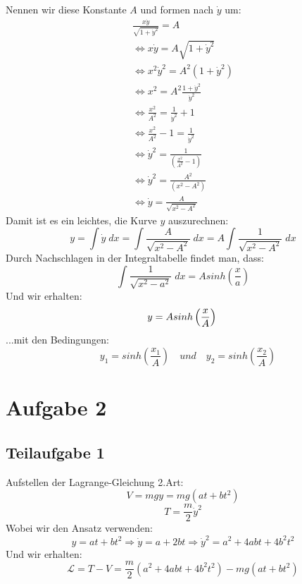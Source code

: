 \documentclass[a4paper,german,12pt,smallheadings]{scrartcl}
\begin{document}
Nennen wir diese Konstante $A$ und formen nach $\dot{y}$ um:
\begin{align*}
\frac{x \dot{y}}{\sqrt{1+ \dot{y}^2}}=A\\
\Leftrightarrow x \dot{y}=A \sqrt{1+\dot{y}^2}\\
\Leftrightarrow x^2 \dot{y}^2=A^2\left(1+\dot{y}^2\right)\\
\Leftrightarrow x^2=A^2 \frac{1+\dot{y}^2}{\dot{y}^2}\\
\Leftrightarrow \frac{x^2}{A^2}=\frac{1}{\dot{y}^2}+1\\
\Leftrightarrow \frac{x^2}{A^2}-1=\frac{1}{\dot{y}^2}\\
\Leftrightarrow \dot{y}^2=\frac{1}{\left(\frac{x^2}{A^2}-1\right)}\\
\Leftrightarrow \dot{y}^2=\frac{A^2}{\left(x^2-A^2\right)}\\
\Leftrightarrow \dot{y}=\frac{A}{\sqrt{x^2-A^2}}
\end{align*}
Damit ist es ein leichtes, die Kurve $y$ auszurechnen:
\begin{equation}
y=\int \dot{y} \; dx=\int \frac{A}{\sqrt{x^2-A^2}} \; dx=A \int \frac{1}{\sqrt{x^2-A^2}} \; dx
\end{equation}
Durch Nachschlagen in der Integraltabelle findet man, dass:
\begin{equation}
\int \frac{1}{\sqrt{x^2-a^2}} \; dx=A sinh\left(\frac{x}{a}\right)
\end{equation}
Und wir erhalten:
\begin{equation}
y=A sinh\left(\frac{x}{A}\right) \quad\\ 
\end{equation}
...mit den Bedingungen:
\begin{equation}
\quad y_1=sinh\left(\frac{x_1}{A}\right) \quad und \quad y_2=sinh\left(\frac{x_2}{A}\right)
\end{equation}

\section*{Aufgabe 2}
\subsection*{Teilaufgabe 1}
Aufstellen der Lagrange-Gleichung 2.Art:
\begin{equation}
V=mgy=mg\left(at+bt^2\right)
\end{equation}
\begin{equation}
T=\frac{m}{2} \dot{y}^2
\end{equation}
Wobei wir den Ansatz verwenden:
\begin{equation}
y=at+bt^2 \Rightarrow \dot{y}=a+2bt \Rightarrow \dot{y}^2=a^2+4abt+4b^2t^2
\end{equation}
Und wir erhalten:
\begin{equation}
\mathcal{L}=T-V=\frac{m}{2} \left(a^2+4abt+4b^2t^2\right) - mg\left(at+bt^2\right)
\end{equation}
\end{document}
